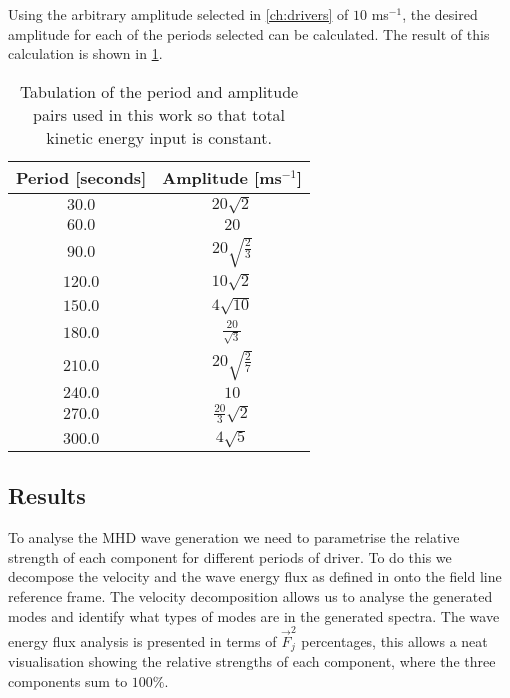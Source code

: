 Using the arbitrary amplitude selected in \cref{ch:drivers} of $10$ ms$^{-1}$, the desired amplitude for each of the periods selected can be calculated.
The result of this calculation is shown in \cref{tab:period-amp}.
\begin{table}
    \centering
    \begin{tabular}{cc}
        Period [seconds] & Amplitude [ms$^{-1}$] 	\\ \hline
        $30.0$           & $20\sqrt{2}$           	\\[2ex]
        $60.0$           & $20$  		            \\[2ex]
        $90.0$           & $20\sqrt{\frac{2}{3}}$  \\[2ex]
        $120.0$          & $10\sqrt{2}$        	\\[2ex]
        $150.0$          & $4\sqrt{10}$            \\[2ex]
        $180.0$          & $\frac{20}{\sqrt{3}}$   \\[2ex]
        $210.0$          & $20\sqrt{\frac{2}{7}}$  \\[2ex]
        $240.0$          & $10$                 	\\[2ex]
        $270.0$          & $\frac{20}{3}\sqrt{2}$  \\[2ex]
        $300.0$          & $4\sqrt{5}$           	\\[2ex]
    \end{tabular}
    \caption{Tabulation of the period and amplitude pairs used in this work so that total kinetic energy input is constant.}
    \label{tab:period-amp}
\end{table}

\subsection{Results}\label{subsec:results}

To analyse the MHD wave generation we need to parametrise the relative strength of each component for different periods of driver.
To do this we decompose the velocity and the wave energy flux as defined in \cite{bogdan2003} onto the field line reference frame.
The velocity decomposition allows us to analyse the generated modes and identify what types of modes are in the generated spectra.
The wave energy flux analysis is presented in terms of $\vec{F}^2_j$ percentages, this allows a neat visualisation showing the relative strengths of each component, where the three components sum to $100\%$.


